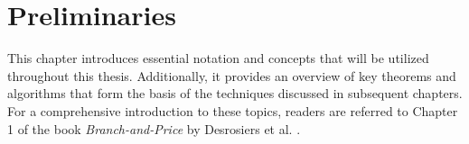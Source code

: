 \chapter{Preliminaries}\label{ch:preliminaries}
This chapter introduces essential notation and concepts that will be utilized throughout this thesis. Additionally, it provides an overview of key theorems and algorithms that form the basis of the techniques discussed in subsequent chapters. For a comprehensive introduction to these topics, readers are referred to Chapter 1 of the book \textit{Branch-and-Price} by Desrosiers et al. \cite{thebook}.



